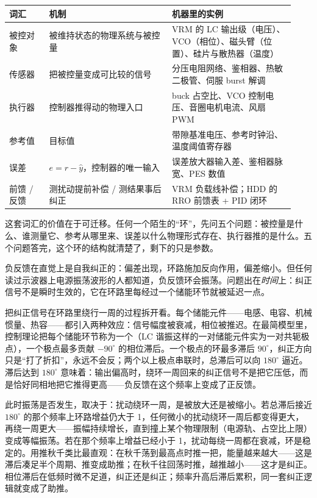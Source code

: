 \begin{longtable}{L{0.13\linewidth}L{0.40\linewidth}L{0.40\linewidth}}
\toprule
词汇 & 机制 & 机器里的实例 \\
\midrule
被控对象 & 被维持状态的物理系统与被控量 & VRM 的 LC 输出级（电压）、VCO（相位）、磁头臂（位置）、硅片与散热器（温度） \\\tablerowrule
传感器 & 把被控量变成可比较的信号 & 分压电阻网络、鉴相器、热敏二极管、伺服 burst 解调 \\\tablerowrule
执行器 & 控制器推得动的物理入口 & buck 占空比、VCO 控制电压、音圈电机电流、风扇 PWM \\\tablerowrule
参考值 & 目标值 & 带隙基准电压、参考时钟沿、温度阈值寄存器 \\\tablerowrule
误差 & $e = r - \hat{y}$，控制器的唯一输入 & 误差放大器输入差、鉴相器脉宽、PES 数值 \\\tablerowrule
前馈 / 反馈 & 测扰动提前补偿 / 测结果事后纠正 & VRM 负载线补偿；HDD 的 RRO 前馈表 + PID 闭环 \\
\bottomrule
\end{longtable}

这套词汇的价值在于可迁移。任何一个陌生的“环”，先问五个问题：被控量是什么、谁测量它、参考从哪里来、误差以什么物理形式存在、执行器推的是什么。五个问题答完，这个环的结构就清楚了，剩下的只是参数。


负反馈在直觉上是自我纠正的：偏差出现，环路施加反向作用，偏差缩小。但任何读过示波器上电源振荡波形的人都知道，负反馈环会振荡。问题出在\emph{时间}上：纠正信号不是瞬时生效的，它在环路里每经过一个储能环节就被延迟一点。

把纠正信号在环路里绕行一周的过程拆开看。每个储能元件——电感、电容、机械惯量、热容——都引入两种效应：信号幅度被衰减，相位被推迟。在最简模型里，控制理论把每个储能环节称为一个（LC 谐振这样的一对储能元件实为一对共轭极点），一个极点最多贡献 $-90^{\circ}$ 的相位滞后。一个极点的环最多滞后 $90^{\circ}$，纠正方向只是“打了折扣”，永远不会反；两个以上极点串联时，总滞后可以向 $180^{\circ}$ 逼近。滞后达到 $180^{\circ}$ 意味着：输出偏高时，绕环一周回来的纠正信号不是把它压低，而是恰好同相地把它推得更高——负反馈在这个频率上变成了正反馈。

此时振荡是否发生，取决于：扰动绕环一周，是被放大还是被缩小。若总滞后接近 $180^{\circ}$ 的那个频率上环路增益仍大于 1，任何微小的扰动绕环一周后都变得更大，再绕一周更大——振幅持续增长，直到撞上某个物理限制（电源轨、占空比上限）变成等幅振荡。若在那个频率上增益已经小于 1，扰动每绕一周都在衰减，环是稳定的。用推秋千类比最直观：在秋千荡到最高点时推一把，能量越来越大——这是滞后凑足半个周期、推变成助推；在秋千往回荡时推，越推越小——这才是纠正。相位滞后在低频时微不足道，纠正还是纠正；频率升高后滞后累积，同一套纠正逻辑就变成了助推。

